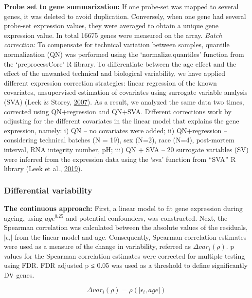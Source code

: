 \documentclass[12pt,twoside]{unicam}
\begin{document}
\textbf{Probe set to gene summarization:} If one probe-set was mapped to several genes, it was deleted to avoid duplication. Conversely, when one gene had several probe-set expression values, they were averaged to obtain a unique gene expression value. In total 16675 genes were measured on the array.
\emph{Batch correction:} To compensate for technical variation between samples, quantile normalization (QN) was performed using the `normalize.quantiles' function from the `preprocessCore' R library. To differentiate between the age effect and the effect of the unwanted technical and biological variability, we have applied different expression correction strategies: linear regression of the known covariates, unsupervised estimation of covariates using surrogate variable analysis (SVA) (Leek \& Storey, \protect\hyperlink{ref-Leek2007}{2007}). As a result, we analyzed the same data two times, corrected using QN+regression and QN+SVA. Different corrections work by adjusting for the different covariates in the linear model that explains the gene expression, namely: i) QN -- no covariates were added; ii) QN+regression -- considering technical batches (N = 19), sex (N=2), race (N=4), post-mortem interval, RNA integrity number, pH; iii) QN + SVA -- 20 surrogate variables (SV) were inferred from the expression data using the `sva' function from ``SVA'' R library (Leek et al., \protect\hyperlink{ref-svapack}{2019}).

\hypertarget{differential-variability}{%
\subsubsection{Differential variability}\label{differential-variability}}

\textbf{The continuous approach:} First, a linear model to fit gene expression during ageing, using \(age^{0.25}\) and potential confounders, was constructed. Next, the Spearman correlation was calculated between the absolute values of the residuals, \(|\epsilon_i|\) from the linear model and age. Consequently, Spearman correlation estimates were used as a measure of the change in variability, referred as \(\Delta var_i(\rho)\). p values for the Spearman correlation estimates were corrected for multiple testing using FDR. FDR adjusted p ≤ 0.05 was used as a threshold to define significantly DV genes.

\[\Delta var_i(\rho)=\rho(|\epsilon_i,age|)\]
\end{document}
